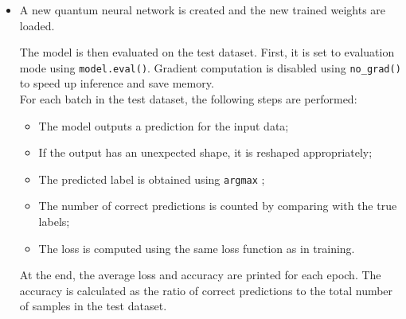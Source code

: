 \documentclass[conference]{IEEEtran}
\begin{document}
\begin{itemize}
        The loss function is used to measure the difference between the predicted output and the true labels. In this case, the  $Negative Log Likelihood Loss$ \cite{pytorch_NLLloss} is used.
        The model is trained for 10 epochs. In each epoch, it iterates over the training batches and performs the following steps:

    \begin{itemize}
        \item Gradients are reset with \texttt{optimizer.zero\_grad()}.
        \item A forward pass is performed to get the model's predictions.
        \item The loss between predictions and true labels is computed.
        \item A backward pass computes gradients.
        \item The model updates its weights using the optimizer.
        \item Loss values for the epoch are stored and averaged.
    \end{itemize}


    \item A new quantum neural network is created and the new trained weights are loaded.

    The model is then evaluated on the test dataset. First, it is set to evaluation mode using \texttt{model.eval()}. Gradient computation is disabled using \texttt{no\_grad()} to speed up inference and save memory.\\

    For each batch in the test dataset, the following steps are performed:
    \begin{itemize}
        \item The model outputs a prediction for the input data;
        \item If the output has an unexpected shape, it is reshaped appropriately;
        \item The predicted label is obtained using \texttt{argmax} \cite{pytorch_argmax};
        \item The number of correct predictions is counted by comparing with the true labels;
        \item The loss is computed using the same loss function as in training.
    \end{itemize}

    At the end, the average loss and accuracy are printed for each epoch. The accuracy is calculated as the ratio of correct predictions to the total number of samples in the test dataset.
\end{itemize}
\end{document}
